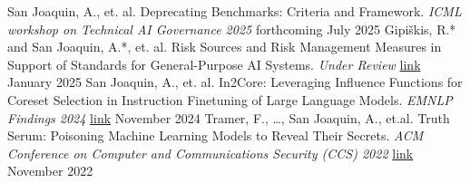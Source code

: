 \documentclass[]{awesome-cv}
\makeatletter
\renewcommand*{\cventry}[5]{%
  \vspace{-2.0mm}
  \setlength\tabcolsep{0pt}
  \setlength{\extrarowheight}{0pt}
  \begin{tabular*}{\textwidth}{@{\extracolsep{\fill}} L{\textwidth - 4.5cm} R{4.5cm}}
    \ifempty{#2#3}
      {\ifempty{#1#4}{}{\entrypositionstyle{#1} & \entrydatestyle{#4} \\}}
      {\entrytitlestyle{#2} & \entrylocationstyle{#3} 
       \ifempty{#1#4}{}{\\\entrypositionstyle{#1} & \entrydatestyle{#4}}}
    \ifempty{#5}{}{\\\multicolumn{2}{L{\textwidth}}{\descriptionstyle{#5}}}
  \end{tabular*}%
  \par %
}
\makeatother
\begin{document}
\vspace{-3mm}
\vspace{-3mm}
\begin{cvhonors}
	\cvhonor
	{San Joaquin, A., \textnormal{et. al.} }
	{Deprecating Benchmarks: Criteria and Framework. \textit{ICML workshop on Technical AI Governance 2025} }
	{forthcoming}
	{July 2025}
	\cvhonor
	{\textnormal{Gipiškis, R.* and} San Joaquin, A.*, \textnormal{et. al.} }
	{Risk Sources and Risk Management Measures in Support of Standards for General-Purpose AI Systems. \textit{Under Review}}
	{\href{https://arxiv.org/pdf/2410.23472}{link}}
	{January 2025}
	\cvhonor
	{San Joaquin, A., \textnormal{et. al.} }
	{In2Core: Leveraging Influence Functions for Coreset Selection in Instruction Finetuning of Large Language Models. \textit{EMNLP Findings 2024} }
	{\href{https://arxiv.org/abs/2212.01933}{link}}
	{November 2024}
	\cvhonor
	{\textnormal{Tramer, F., \dots ,} San Joaquin, A., \textnormal{ et.al.} }
	{Truth Serum: Poisoning Machine Learning Models to Reveal Their Secrets. \textit{ACM Conference on Computer and Communications Security (CCS) 2022}}
	{\href{https://dl.acm.org/doi/10.1145/3548606.3560554}{link}}
	{November 2022}
\end{cvhonors}

\vspace{-6mm}


\vspace{-20mm}
\end{document}
